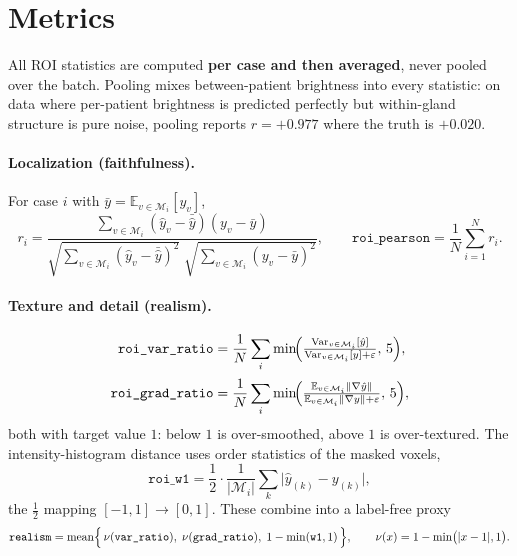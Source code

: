 \documentclass[11pt]{article}
\newcommand{\yhat}{\hat{y}}
\newcommand{\roi}{\mathcal{M}}
\newcommand{\Var}{\operatorname{Var}}
\newcommand{\Ex}{\mathbb{E}}
\newcommand{\1}{\mathbb{1}}
\begin{document}
\section{Metrics}

All ROI statistics are computed \textbf{per case and then averaged}, never pooled over the
batch. Pooling mixes between-patient brightness into every statistic: on data where
per-patient brightness is predicted perfectly but within-gland structure is pure noise,
pooling reports $r=+0.977$ where the truth is $+0.020$.

\paragraph{Localization (faithfulness).} For case $i$ with $\bar y=\Ex_{v\in\roi_i}[y_v]$,
\begin{equation}
r_i=\frac{\sum_{v\in\roi_i}(\yhat_v-\bar{\yhat})(y_v-\bar y)}
{\sqrt{\sum_{v\in\roi_i}(\yhat_v-\bar{\yhat})^2}\;\sqrt{\sum_{v\in\roi_i}(y_v-\bar y)^2}},
\qquad
\texttt{roi\_pearson}=\frac{1}{N}\sum_{i=1}^{N} r_i .
\end{equation}

\paragraph{Texture and detail (realism).}
\begin{align}
\texttt{roi\_var\_ratio} &= \frac{1}{N}\sum_i \min\!\Bigl(\tfrac{\Var_{v\in\roi_i}[\yhat]}{\Var_{v\in\roi_i}[y]+\varepsilon},\,5\Bigr), \\[2pt]
\texttt{roi\_grad\_ratio} &= \frac{1}{N}\sum_i \min\!\Bigl(\tfrac{\Ex_{v\in\roi_i}\lVert\nabla\yhat\rVert}{\Ex_{v\in\roi_i}\lVert\nabla y\rVert+\varepsilon},\,5\Bigr),
\end{align}
both with target value $1$: below $1$ is over-smoothed, above $1$ is over-textured.
The intensity-histogram distance uses order statistics of the masked voxels,
\begin{equation}
\texttt{roi\_w1}=\frac{1}{2}\cdot\frac{1}{|\roi_i|}\sum_{k}\bigl|\yhat_{(k)}-y_{(k)}\bigr| ,
\end{equation}
the $\tfrac12$ mapping $[-1,1]\!\to\![0,1]$. These combine into a label-free proxy
\begin{equation}
\texttt{realism} = \operatorname{mean}\Bigl\{\,\nu(\texttt{var\_ratio}),\;\nu(\texttt{grad\_ratio}),\;1-\min(\texttt{w1},1)\,\Bigr\},
\qquad \nu(x)=1-\min\bigl(|x-1|,1\bigr).
\end{equation}
\end{document}
